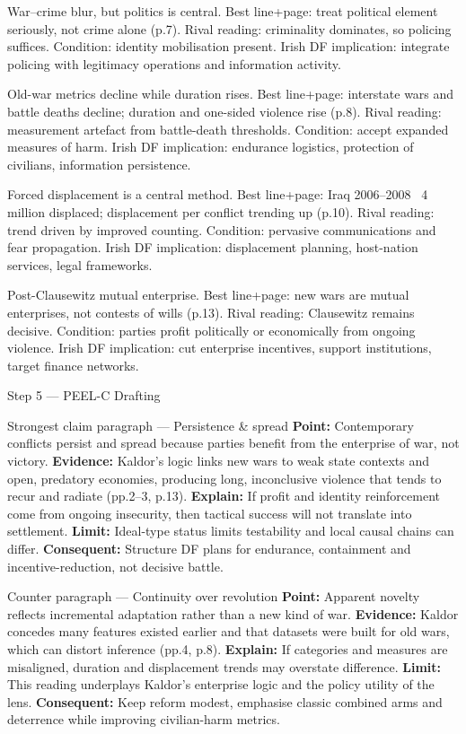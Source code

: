 War–crime blur, but politics is central.
Best line+page: treat political element seriously, not crime alone (p.7). Rival reading: criminality dominates, so policing suffices. Condition: identity mobilisation present. Irish DF implication: integrate policing with legitimacy operations and information activity.

Old-war metrics decline while duration rises.
Best line+page: interstate wars and battle deaths decline; duration and one-sided violence rise (p.8). Rival reading: measurement artefact from battle-death thresholds. Condition: accept expanded measures of harm. Irish DF implication: endurance logistics, protection of civilians, information persistence.

Forced displacement is a central method.
Best line+page: Iraq 2006–2008 ~4 million displaced; displacement per conflict trending up (p.10). Rival reading: trend driven by improved counting. Condition: pervasive communications and fear propagation. Irish DF implication: displacement planning, host-nation services, legal frameworks.

Post-Clausewitz mutual enterprise.
Best line+page: new wars are mutual enterprises, not contests of wills (p.13). Rival reading: Clausewitz remains decisive. Condition: parties profit politically or economically from ongoing violence. Irish DF implication: cut enterprise incentives, support institutions, target finance networks.

Step 5 — PEEL-C Drafting

Strongest claim paragraph — Persistence & spread
\textbf{Point:} Contemporary conflicts persist and spread because parties benefit from the enterprise of war, not victory. \textbf{Evidence:} Kaldor’s logic links new wars to weak state contexts and open, predatory economies, producing long, inconclusive violence that tends to recur and radiate (pp.2–3, p.13). \textbf{Explain:} If profit and identity reinforcement come from ongoing insecurity, then tactical success will not translate into settlement. \textbf{Limit:} Ideal-type status limits testability and local causal chains can differ. \textbf{Consequent:} Structure DF plans for endurance, containment and incentive-reduction, not decisive battle.

Counter paragraph — Continuity over revolution
\textbf{Point:} Apparent novelty reflects incremental adaptation rather than a new kind of war. \textbf{Evidence:} Kaldor concedes many features existed earlier and that datasets were built for old wars, which can distort inference (pp.4, p.8). \textbf{Explain:} If categories and measures are misaligned, duration and displacement trends may overstate difference. \textbf{Limit:} This reading underplays Kaldor’s enterprise logic and the policy utility of the lens. \textbf{Consequent:} Keep reform modest, emphasise classic combined arms and deterrence while improving civilian-harm metrics.

